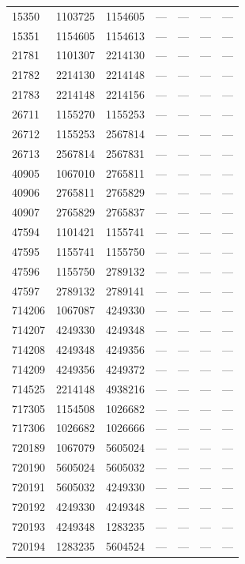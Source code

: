 \begin{longtable}{lcccccc}
15350 & 1103725 & 1154605 & --- & --- & --- & --- \\
15351 & 1154605 & 1154613 & --- & --- & --- & --- \\
21781 & 1101307 & 2214130 & --- & --- & --- & --- \\
21782 & 2214130 & 2214148 & --- & --- & --- & --- \\
21783 & 2214148 & 2214156 & --- & --- & --- & --- \\
26711 & 1155270 & 1155253 & --- & --- & --- & --- \\
26712 & 1155253 & 2567814 & --- & --- & --- & --- \\
26713 & 2567814 & 2567831 & --- & --- & --- & --- \\
40905 & 1067010 & 2765811 & --- & --- & --- & --- \\
40906 & 2765811 & 2765829 & --- & --- & --- & --- \\
40907 & 2765829 & 2765837 & --- & --- & --- & --- \\
47594 & 1101421 & 1155741 & --- & --- & --- & --- \\
47595 & 1155741 & 1155750 & --- & --- & --- & --- \\
47596 & 1155750 & 2789132 & --- & --- & --- & --- \\
47597 & 2789132 & 2789141 & --- & --- & --- & --- \\
714206 & 1067087 & 4249330 & --- & --- & --- & --- \\
714207 & 4249330 & 4249348 & --- & --- & --- & --- \\
714208 & 4249348 & 4249356 & --- & --- & --- & --- \\
714209 & 4249356 & 4249372 & --- & --- & --- & --- \\
714525 & 2214148 & 4938216 & --- & --- & --- & --- \\
717305 & 1154508 & 1026682 & --- & --- & --- & --- \\
717306 & 1026682 & 1026666 & --- & --- & --- & --- \\
720189 & 1067079 & 5605024 & --- & --- & --- & --- \\
720190 & 5605024 & 5605032 & --- & --- & --- & --- \\
720191 & 5605032 & 4249330 & --- & --- & --- & --- \\
720192 & 4249330 & 4249348 & --- & --- & --- & --- \\
720193 & 4249348 & 1283235 & --- & --- & --- & --- \\
720194 & 1283235 & 5604524 & --- & --- & --- & --- \\

\end{longtable}
